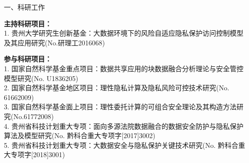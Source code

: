 \documentclass[pdftex,notypeinfo,twoside,openany,UTF8,fntef]{CASthesis}
\theoremstyle{THrm}{
	\newtheorem{question}{Question}[section]
	\newtheorem{property}{性质}[section]
	\newtheorem{assumption}{假设}[section]
	\newtheorem{claim}[lemma]{断言}
	
}
\begin{document}
\newpage
{}  %

\begin{resumesection}{一、科研工作}

\textbf{主持科研项目：}\\
1. 贵州大学研究生创新基金：大数据环境下的风险自适应隐私保护访问控制模型及其应用研究(No.研理工2016068)

\textbf{参与科研项目：}\\
1. 国家自然科学基金重点项目：数据共享应用的块数据融合分析理论与安全管控模型研究(No. U1836205)\\
2. 国家自然科学基金地区项目：理性隐私计算及隐私风险可控技术研究(No. 61662009)\\
3.  国家自然科学基金面上项目：理性委托计算的可组合安全理论及其构造方法研究(No.61772008)\\
4. 贵州省科技计划重大专项：面向多源法院数据融合的数据安全防护与隐私保护算法及模型研究(No. 黔科合重大专项字[2017]3002)\\
5. 贵州省科技计划重大专项：大数据安全与隐私保护关键技术研究(No. 黔科合重大专项字[2018]3001)

\end{resumesection}
\end{document}

